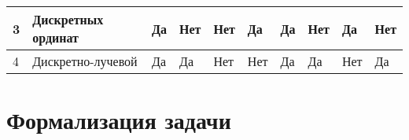 \begin{FixLineStretch}
\begin{sidewaystable}
\begin{tabular}{|p{\wA}|p{\wB}|p{\wC}|p{\wD}|p{\wE}|p{\wF}|p{\wG}|p{\wH}|p{\wI}|p{\wJ}|}
		3                    & \everypar{\hspace*{0pt}} Дискретных ординат \cite{surzhikov}                                            & Да                                                           & Нет                                                                             & Нет                                                                               & Да                                                       & Да                                                                                             & Нет                                                                                                        & Да                                                           & Нет                                      \\ \hline
		4                    & \everypar{\hspace*{0pt}} Дискретно-лучевой \cite{gradov-dissertation}                                   & Да                                                           & Да                                                                              & Нет                                                                               & Нет                                                      & Да                                                                                             & Да                                                                                                         & Нет                                                          & Да                                       \\ \hline
	\end{tabular}
\end{sidewaystable}
\end{FixLineStretch}
\let\wJ\relax
\let\wI\relax
\let\wH\relax
\let\wG\relax
\let\wF\relax
\let\wE\relax
\let\wD\relax
\let\wC\relax
\let\wB\relax
\let\wA\relax

\section{Формализация задачи}


\let\wF\relax